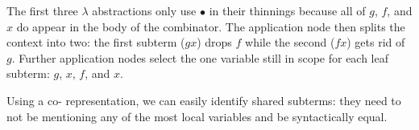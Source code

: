 \begin{center}
  \codebruijnexamplegraph{}
\end{center}

The first three $\lambda$ abstractions only use $\bullet$ in their thinnings
because all of $g$, $f$, and $x$ do appear in the body of the combinator.
%
The application node then splits the context into two: the first subterm
($g x$) drops $f$ while the second ($f x$) gets rid of $g$.
%
Further application nodes select the one variable still in scope for each
leaf subterm: $g$, $x$, $f$, and $x$.


Using a co-\DeBruijn{} representation, we can easily identify shared subterms:
they need to not be mentioning any of the most local variables and be
syntactically equal.
